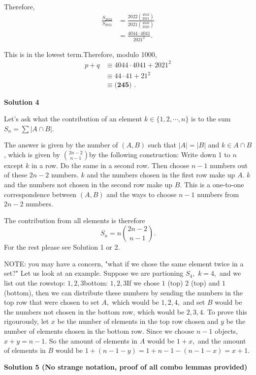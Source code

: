 \begin{enumerate}
 Therefore,
 \begin{align*} \frac{S_{2022}}{S_{2021}} & = \frac{2022 \binom{4042}{2021}}{2021 \binom{4040}{2020}} \\ & = \frac{4044 \cdot 4041}{2021^2} . \end{align*}


 This is in the lowest term.Therefore, modulo 1000,
 \begin{align*} p + q  & \equiv 4044 \cdot 4041 + 2021^2 \\ & \equiv 44 \cdot 41 + 21^2 \\ & \equiv \boxed{\textbf{(245) }} . \end{align*}





\textbf{Solution 4}

Let's ask what the contribution of an element $k\in \{1,2,\cdots,n\}$ is to the sum $S_n = \sum | A \cap B |.$

 The answer is given by the number of $(A,B)$ such that $|A|=|B|$ and $k \in A\cap B$, which is given by $\binom{2n-2}{n-1}$by the following construction: Write down 1 to $n$ except $k$ in a row. Do the same in a second row. Then choose $n-1$ numbers out of these $2n-2$ numbers. $k$ and the numbers chosen in the first row make up $A$. $k$ and the numbers not chosen in the second row make up $B$. This is a one-to-one correspondence between $(A,B)$ and the ways to choose $n-1$ numbers from $2n-2$ numbers.

 The contribution from all elements is therefore 
 \[S_n = n\binom{2n-2}{n-1}.\]For the rest please see Solution 1 or 2.

 NOTE: you may have a concern, "what if we chose the same element twice in a set?" Let us look at an example. Suppose we are partioning $S_4,$ $k=4,$ and we list out the rowstop: $1,2,3$bottom: $1,2,3$If we chose $1$ (top) $2$ (top) and $1$ (bottom), then we can distribute these numbers by sending the numbers in the top row that were chosen to set $A,$ which would be ${1,2,4},$ and set $B$ would be the numbers not chosen in the bottom row, which would be ${2,3,4}.$ To prove this rigourously, let $x$ be the number of elements in the top row chosen and $y$ be the number of elements chosen in the bottom row. Since we choose $n-1$ objects, $x+y=n-1.$ So the amount of elements in $A$ would be $1+x,$ and the amount of elements in $B$ would be $1+(n-1-y)=1+n-1-(n-1-x)=x+1.$




\textbf{Solution 5 (No strange notation, proof of all combo lemmas provided)}


\end{enumerate}

